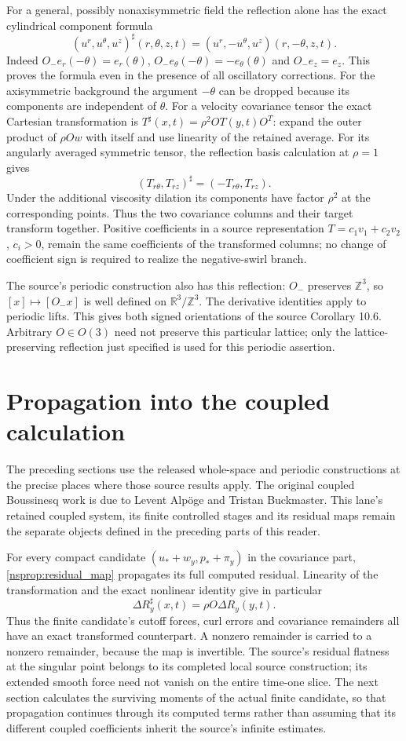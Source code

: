 For a general, possibly nonaxisymmetric field the reflection alone has
the exact cylindrical component formula
\[
 (u^r,u^\theta,u^z)^\sharp(r,\theta,z,t)
    =(u^r,-u^\theta,u^z)(r,-\theta,z,t).
\]
Indeed $O_-e_r(-\theta)=e_r(\theta)$,
$O_-e_\theta(-\theta)=-e_\theta(\theta)$ and $O_-e_z=e_z$.
This proves the formula even in the presence of all oscillatory
corrections. For the axisymmetric background the argument $-\theta$
can be dropped because its components are independent of $\theta$.
For a velocity covariance tensor the exact Cartesian transformation is
$T^\sharp(x,t)=\rho^2 O T(y,t)O^T$: expand the outer product of
$\rho Ow$ with itself and use linearity of the retained average.
For its angularly averaged symmetric tensor, the reflection basis
calculation at $\rho=1$ gives
\[
 (T_{r\theta},T_{rz})^\sharp=(-T_{r\theta},T_{rz}).
\]
Under the additional viscosity dilation its components have factor
$\rho^2$ at the corresponding points. Thus the two covariance columns
and their target transform together. Positive coefficients in a source
representation $T=c_1v_1+c_2v_2$, $c_i>0$, remain the same coefficients
of the transformed columns; no change of coefficient sign is required
to realize the negative-swirl branch.

The source's periodic construction also has this reflection: $O_-$
preserves $\mathbb Z^3$, so $[x]\mapsto[O_-x]$ is well defined on
$\mathbb R^3/\mathbb Z^3$. The derivative identities apply to periodic
lifts. This gives both signed orientations of the source Corollary 10.6.
Arbitrary $O\in O(3)$ need not preserve this particular lattice; only
the lattice-preserving reflection just specified is used for this
periodic assertion.

\section{Propagation into the coupled calculation}
\label{nsprop:programme}
The preceding sections use the released whole-space and periodic
constructions at the precise places where those source results apply.
The original coupled Boussinesq work is due to Levent Alp\"oge and
Tristan Buckmaster. This lane's retained coupled system, its finite
controlled stages and its residual maps remain the separate objects
defined in the preceding parts of this reader.

For every compact candidate $(u_*+w_y,p_*+\pi_y)$ in the covariance
part, \eqref{nsprop:residual_map} propagates its full computed residual.
Linearity of the transformation and the exact nonlinear identity give
in particular
\[
 \Delta R_y^\sharp(x,t)=\rho O\Delta R_y(y,t).
\]
Thus the finite candidate's cutoff forces, curl errors and covariance
remainders all have an exact transformed counterpart. A nonzero
remainder is carried to a nonzero remainder, because the map is
invertible. The source's residual flatness at the singular point belongs
to its completed local source construction; its extended smooth force
need not vanish on the entire time-one slice. The next section calculates the
surviving moments of the actual finite candidate, so that propagation
continues through its computed terms rather than assuming that its
different coupled coefficients inherit the source's infinite estimates.

